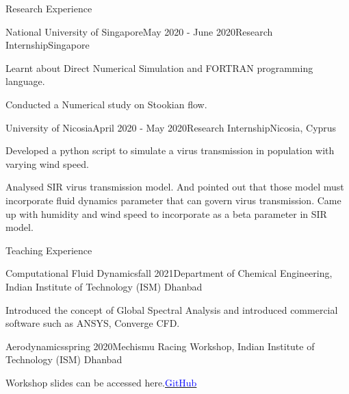 \documentclass{resume} %
\begin{document}
\begin{rSection}{Research Experience}

\begin{rSubsection}{National University of Singapore}{May 2020 - June 2020}{Research Internship}{Singapore}
\item Learnt about Direct Numerical Simulation and FORTRAN programming language.
\item Conducted a Numerical study on Stookian flow. 
\end{rSubsection}
\begin{rSubsection}{University of Nicosia}{April 2020 - May 2020}{Research Internship}{Nicosia, Cyprus}
\item Developed a python script to simulate a virus transmission in population with varying wind speed. 
\item Analysed SIR virus transmission model. And pointed out that those model must incorporate fluid dynamics parameter that can govern virus transmission. Came up with humidity and wind speed to incorporate as a beta parameter in SIR model.  

\end{rSubsection}

\end{rSection}


\begin{rSection}{Teaching Experience}
\begin{rSubsection}{Computational Fluid Dynamics}{fall 2021}{Department of Chemical Engineering, Indian Institute of Technology (ISM) Dhanbad}
\item Introduced the concept of Global Spectral Analysis and introduced commercial software such as ANSYS, Converge CFD. 
\end{rSubsection}

\begin{rSubsection}{Aerodynamics}{spring 2020}{Mechismu Racing Workshop, Indian Institute of Technology (ISM) Dhanbad}
\item Workshop slides can be accessed here.\href{https://github.com/Sumanshekhar17/Mechismu-Racing-Aerodynamics}{\textcolor{blue}{GitHub}}
\end{rSubsection}
\end{rSection}
\end{document}
